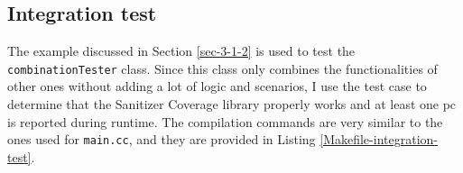 \documentclass{elteikthesis}[2018/06/06]
\newcommand*{\code}{\lstinline[keywordstyle=\color{violet}, basicstyle=\color{violet}]}
\begin{document}
\subsection{Integration test}
\label{sec-3-3-3}
The example discussed in Section \ref{sec-3-1-2} is used to test the \code{combinationTester} class. Since this class only combines the functionalities of other ones without adding a lot of logic and scenarios, I use the test case to determine that the Sanitizer Coverage library properly works and at least one pc is reported during runtime. The compilation commands are very similar to the ones used for \code{main.cc}, and they are provided in Listing \ref{Makefile-integration-test}. \\

\begin{listing}
\caption{\label{Makefile-integration-test}Compiling the integration test \code{Makefile}}
\inputminted[firstline=97,lastline=118,breaklines]{bash}{Makefile} \\
\end{listing}
\end{document}
